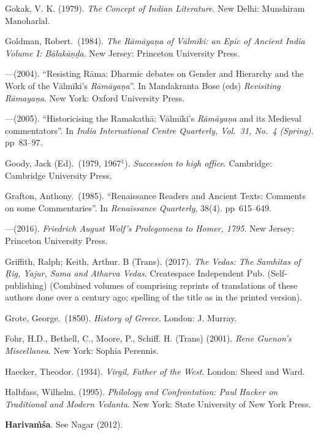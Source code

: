 \begin{thebibliography}{99}
Gokak, V. K.  (1979). {\sl The Concept of Indian Literature}. New Delhi: Munshiram Manoharlal. 

Goldman, Robert.\ (1984). {\sl The Rāmāyaṇa of Vālmīki: an Epic of Ancient India Volume I: Bālakāṇḍa}. New Jersey: Princeton University Press. 

---\kern3pt(2004). “Resisting Rāma: Dharmic debates on Gender and Hierarchy and the Work of the Vālmīki’s {\sl Rāmāyaṇa}”. In Mandakranta Bose (eds) {\sl Revisiting Rāmayaṇa}. New York: Oxford University Press. 

---\kern3pt(2005). “Historicising the Ramakathā: Vālmīki's {\sl Rāmāyaṇa} and its Medieval commentators”. In {\sl India International Centre Quarterly, Vol.~31, No.~4 (Spring)}. pp~83--97.

Goody, Jack (Ed).\ (1979, 1967$^{1}$). {\sl Succession to high office}. Cambridge: Cambridge University Press. 

Grafton, Anthony.\ (1985). “Renaissance Readers and Ancient Texts: Comments on some Commentaries”. In {\sl Renaissance Quarterly}, 38(4). pp~615--649.

---\kern3pt(2016). {\sl Friedrich August Wolf’s Prolegomena to Homer, 1795}.  New Jersey: Princeton University Press. 

Griffith, Ralph; Keith, Arthur. B (Trans). (2017). {\sl The Vedas: The Samhitas of Ṛig, Yajur, Sama and Atharva Vedas}. Createspace Independent Pub. (Self-publishing) (Combined volumes of comprising reprints of translations of these authors done over a century ago; spelling of the title as in the printed version).

Grote, George.\ (1850). {\sl History of Greece}.  London: J. Murray. 

Fohr, H.D., Bethell, C., Moore, P., Schiff. H. (Trans) (2001). {\sl Rene Guenon’s Miscellanea}. New York: Sophia Perennis. 

Haecker, Theodor. (1934). {\sl Virgil, Father of the West}. London: Sheed and Ward. 

Halbfass, Wilhelm. (1995). {\sl Philology and Confrontation: Paul Hacker on Traditional and Modern Vedanta}. New York: State University of New York Press. 

{\bf Harivaṁśa}. See Nagar (2012). 


\end{thebibliography}
